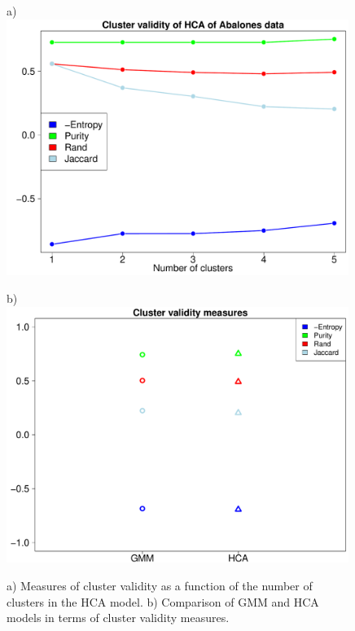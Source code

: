 \documentclass[10pt, paper=a4]{article}
\begin{document}
\begin{figure}[h!]
  \begin{minipage}{0.49\textwidth}
    a)\\
    \includegraphics[width = 0.99\textwidth]{HClust_validity.pdf}
  \end{minipage} \hfill
  \begin{minipage}{0.49\textwidth}
    b)\\
    \includegraphics[width = 0.99\textwidth]{Cluster_comparison.pdf}
  \end{minipage} \vfill
  \caption{a) Measures of cluster validity as a function of the number of
    clusters in the HCA model.  b) Comparison of GMM and HCA models in terms of
    cluster validity measures.}
  \label{fig:clust_quality}
\end{figure}
\end{document}
